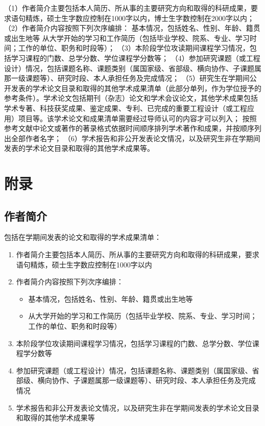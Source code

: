 \documentclass{nuistthesis}
\begin{document}
（1）作者简介主要包括本人简历、所从事的主要研究方向和取得的科研成果，要求语句精炼，硕士生字数应控制在1000字以内，博士生字数控制在2000字以内；
（2）作者简介内容按照下列次序编排：
基本情况，包括姓名、性别、年龄、籍贯或出生地等
从大学开始的学习和工作简历（包括毕业学校、院系、专业、学习时间；工作的单位、职务和时段等）；
（3）本阶段学位攻读期间课程学习情况，包括学习课程的门数、总学分数、学位课程学分数等；
（4）参加研究课题（或工程设计）情况，包括课题名称、课题类别（属国家级、省部级、横向协作、子课题属那一级课题等）、研究时段、本人承担任务及完成情况；
（5）研究生在学期间公开发表的学术论文目录和取得的其他学术成果清单（此部分单列，作为学位授予的参考条件）。学术论文包括期刊（杂志）论文和学术会议论文，其他学术成果包括学术专著、科技获奖成果、鉴定成果、专利、已完成的重要工程设计（或工程应用）项目等。该学术论文和成果清单需要经过导师认可的内容才可以列入；
按照参考文献中论文或著作的著录格式依据时间顺序排列学术著作和成果，并按顺序列出全部作者名字；
（6）学术报告和非公开发表论文情况，以及研究生非在学期间发表的学术论文目录和取得的其他学术成果等。

\section{附录}

\subsection{作者简介}

包括在学期间发表的论文和取得的学术成果清单：

\renewcommand\labelenumi{（\theenumi）}
\begin{enumerate}
    \item 作者简介主要包括本人简历、所从事的主要研究方向和取得的科研成果，要求语句精炼，硕士生字数应控制在1000字以内
    \item 作者简介内容按照下列次序编排：
    \begin{itemize}
        \item 基本情况，包括姓名、性别、年龄、籍贯或出生地等
        \item 从大学开始的学习和工作简历（包括毕业学校、院系、专业、学习时间；工作的单位、职务和时段等）
    \end{itemize}
   \item 本阶段学位攻读期间课程学习情况，包括学习课程的门数、总学分数、学位课程学分数等
   \item 参加研究课题（或工程设计）情况，包括课题名称、课题类别（属国家级、省部级、横向协作、子课题属那一级课题等）、研究时段、本人承担任务及完成情况
   \item 学术报告和非公开发表论文情况，以及研究生非在学期间发表的学术论文目录和取得的其他学术成果等
\end{enumerate}
\end{document}
